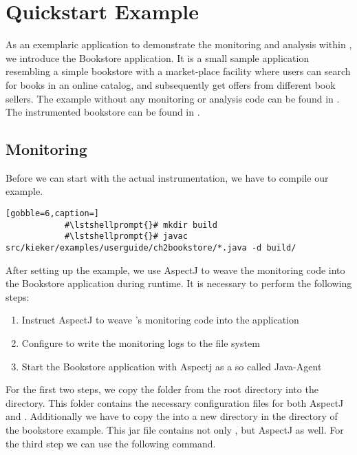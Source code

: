 \chapter{Quickstart Example}\label{chp:Quickstart-Example}

	As an exemplaric application to demonstrate the monitoring and analysis within \Kieker{}, we introduce the Bookstore application. It is a small sample application resembling a simple bookstore with a market-place facility where users can search for books in an online catalog, and subsequently get offers from different book sellers. The example without any monitoring or analysis code can be found in \dir{\plainBookstoreApplicationDirDistro}. The instrumented bookstore can be found in \dir{\quickstartBookstoreApplicationDirDistro}.

	\section{Monitoring}
	
		Before we can start with the actual instrumentation, we have to compile our example.
		\setBashListing
		\begin{lstlisting}[gobble=6,caption=]
			#\lstshellprompt{}# mkdir build
			#\lstshellprompt{}# javac src/kieker/examples/userguide/ch2bookstore/*.java -d build/
		\end{lstlisting} 

		\noindent
		After setting up the example, we use AspectJ \cite{AspectJ-WebSite} to weave the \Kieker{} monitoring code into the Bookstore application during runtime. It is necessary to perform the following steps:
		\begin{enumerate}
			\setlength{\itemsep}{-2pt}
			\item Instruct AspectJ to weave \Kieker{}'s monitoring code into the application
			\item Configure \Kieker{} to write the monitoring logs to the file system
			\item Start the Bookstore application with Aspectj as a so called Java-Agent 
		\end{enumerate}
	
		\noindent
		For the first two steps, we copy the  folder from the root directory into the  directory. This folder contains the necessary configuration files for both AspectJ and \Kieker{}. Additionally we have to copy the  into a new  directory in the directory of the bookstore example. This jar file contains not only \Kieker{}, but AspectJ as well. For the third step we can use the following command.
		
